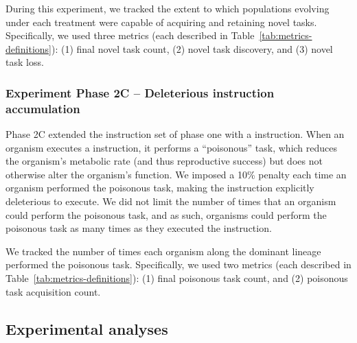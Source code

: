 During this experiment, we tracked the extent to which populations evolving under each treatment were capable of acquiring and retaining novel tasks.  
Specifically, we used three metrics (each described in Table~\ref{tab:metrics-definitions}):
(1) final novel task count, 
(2) novel task discovery, 
and (3) novel task loss. 

\subsubsection{Experiment Phase 2C -- Deleterious instruction accumulation}
\label{sec:methods:exp:deleterious-instruction-accumulation}

Phase 2C extended the instruction set of phase one with a  instruction.
When an organism executes a  instruction, it performs a ``poisonous'' task, which reduces the organism's metabolic rate (and thus reproductive success) but does not otherwise alter the organism's function.
We imposed a 10\% penalty each time an organism performed the poisonous task, making the  instruction explicitly deleterious to execute.
We did not limit the number of times that an organism could perform the poisonous task, and as such, organisms could perform the poisonous task as many times as they executed the  instruction. 

We tracked the number of times each organism along the dominant lineage performed the poisonous task.
Specifically, we used two metrics (each described in Table~\ref{tab:metrics-definitions}):
(1) final poisonous task count,
and (2) poisonous task acquisition count.

\subsection{Experimental analyses}








